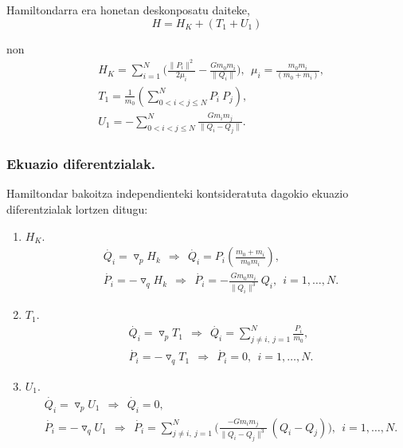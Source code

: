 Hamiltondarra era honetan deskonposatu daiteke,
\begin{equation*}
H=H_K+(T_1+U_1)
\end{equation*}

non
\begin{align*}
&H_K=\sum\limits_{i=1}^{N}\bigg(\frac{\|P_i\|^2}{2 \mu_i} -\frac{G m_0 m_i}{\|Q_i\|}\bigg), \ \ \mu_i=\frac{m_0m_i}{(m_0+m_i)}, \\
&T_1=\frac{1}{m_0} \left(\sum\limits_{0<i<j\le N}^{N} P_i\ P_j \right),\\
&U_1= -\sum\limits_{0< i<j\le N}^{N} \frac{G m_i m_j}{\|Q_i-Q_j\|}.
\end{align*}

\subsubsection*{Ekuazio diferentzialak.}

Hamiltondar bakoitza independienteki kontsideratuta dagokio ekuazio diferentzialak lortzen ditugu:
\begin{enumerate}
\item $H_K$.
\begin{align*}
&\dot{Q_i} = \triangledown_p H_k \ \ \Rightarrow \ \  \dot{Q_i}=P_i\left(\frac{m_0+m_i}{m_0m_i}\right), \\
&\dot{P_i} = -\triangledown_q H_k \ \ \Rightarrow \ \  \dot{P_i}= - \frac{G m_0m_i}{\|Q_i\|^3 }\ Q_i, \ \ i=1,\dots, N.
\end{align*}

\item $T_1$.
\begin{align*}
&\dot{Q_i} = \triangledown_p T_1 \ \ \Rightarrow \ \  \dot{Q_i}=\sum\limits_{j\ne i,\ j=1}^{N} \frac{P_i}{m_0}, \\
&\dot{P_i} = -\triangledown_q T_1 \ \ \Rightarrow \ \  \dot{P_i}= 0, \ \ i=1,\dots, N.
\end{align*}

\item $U_1$.
\begin{align*}
&\dot{Q_i} = \triangledown_p U_1 \ \ \Rightarrow \ \  \dot{Q_i}=0, \\
&\dot{P_i} = -\triangledown_q U_1 \ \ \Rightarrow \ \ 
 \dot{P_i}= \sum\limits_{j \ne i , \ j=1}^{N} \bigg(\frac{-Gm_im_j}{\|Q_i-Q_j\|^3} \ (Q_i-Q_j) \bigg), \ \ i=1,\dots, N.
\end{align*}

\end{enumerate}

